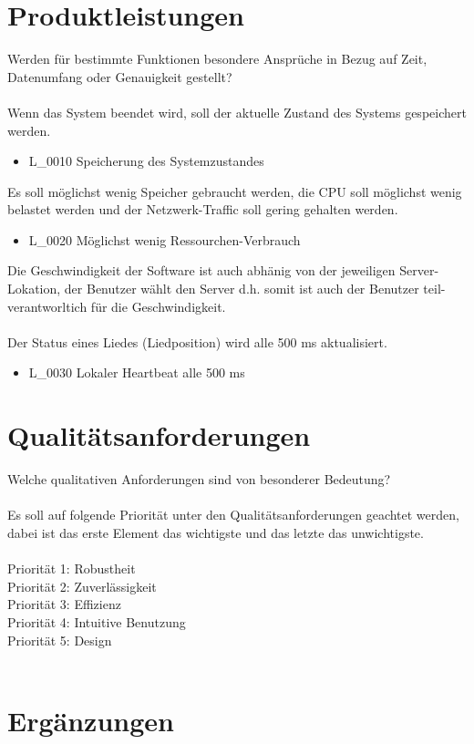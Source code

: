 \section{Produktleistungen}
Werden für bestimmte Funktionen besondere Ansprüche in Bezug auf Zeit, Datenumfang oder Genauigkeit gestellt?\ \\ \\
Wenn das System beendet wird, soll der aktuelle Zustand des Systems gespeichert werden.
\begin{itemize}
	\item L\_0010 Speicherung des Systemzustandes
\end{itemize}
Es soll möglichst wenig Speicher gebraucht werden, die CPU soll möglichst wenig belastet werden und der Netzwerk-Traffic
soll gering gehalten werden.
\begin{itemize}
	\item L\_0020 Möglichst wenig Ressourchen-Verbrauch
\end{itemize}
Die Geschwindigkeit der Software ist auch abhänig von der jeweiligen Server-Lokation, der Benutzer wählt den Server
d.h. somit ist auch der Benutzer teil-verantworltich für die Geschwindigkeit.\ \\ \\
Der Status eines Liedes (Liedposition) wird alle 500 ms aktualisiert.
\begin{itemize}
	\item L\_0030 Lokaler Heartbeat alle 500 ms
\end{itemize}
\section{Qualitätsanforderungen}
Welche qualitativen Anforderungen sind von besonderer Bedeutung?\ \\ \\
Es soll auf folgende Priorität unter den Qualitätsanforderungen geachtet werden,
dabei ist das erste Element das wichtigste und das letzte das unwichtigste.\ \\ \\
Priorität 1: Robustheit\ \\
Priorität 2: Zuverlässigkeit\ \\
Priorität 3: Effizienz\ \\
Priorität 4: Intuitive Benutzung\ \\
Priorität 5: Design\ \\ \\
\section{Ergänzungen}
